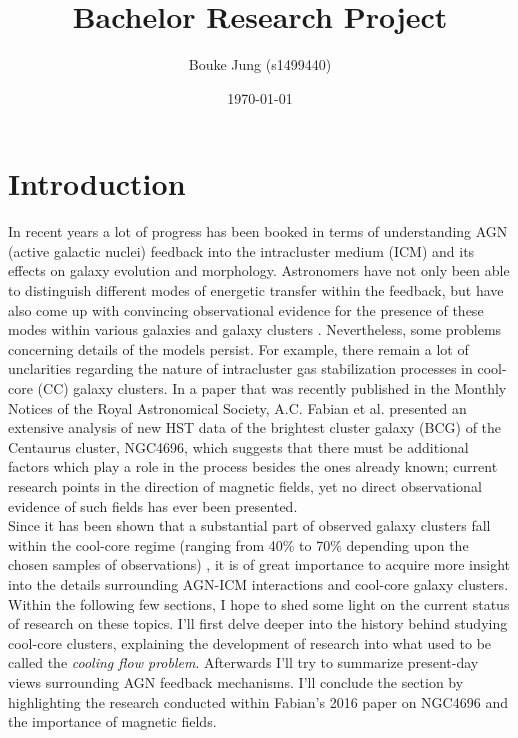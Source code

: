 \documentclass[a4paper]{article}
\title{Bachelor Research Project}
\author{Bouke Jung (s1499440)}
\date{\today}
\begin{document}
\maketitle


\tableofcontents





\section{Introduction}

    \par In recent years a lot of progress has been booked in terms of understanding AGN (active galactic nuclei) feedback into the intracluster medium (ICM) and its effects on galaxy evolution and morphology. Astronomers have not only been able to distinguish different modes of energetic transfer within the feedback, but have also come up with convincing observational evidence for the presence of these modes within various galaxies and galaxy clusters \citep{Fabian2012}.  Nevertheless, some problems concerning details of the models persist. For example, there remain a lot of unclarities regarding the nature of intracluster gas stabilization processes in cool-core (CC) galaxy clusters. In a paper that was recently published in the Monthly Notices of the Royal Astronomical Society\citep{Fabian2016}, A.C. Fabian et al. presented an extensive analysis of new HST data of the brightest cluster galaxy (BCG) of the Centaurus cluster, NGC4696, which suggests that there must be additional factors which play a role in the process besides the ones already known; current research points in the direction of magnetic fields, yet no direct observational evidence of such fields has ever been presented. \\ 
    
    Since it has been shown that a substantial part of observed galaxy clusters fall within the cool-core regime (ranging from 40\% to 70\% depending upon the chosen samples of observations) \citep{Hudson2010, Chen2007, Sanderson2006, Sanderson2009}, it is of great importance to acquire more insight into the details surrounding AGN-ICM interactions and cool-core galaxy clusters. Within the following few sections, I hope to shed some light on the current status of research on these topics. I'll first delve deeper into the history behind studying cool-core clusters, explaining the development of research into what used to be called the \textit{cooling flow problem}. Afterwards I'll try to summarize present-day views surrounding AGN feedback mechanisms. I'll conclude the section by highlighting the research conducted within Fabian's 2016 paper on NGC4696 and the importance of magnetic fields.
\end{document}
